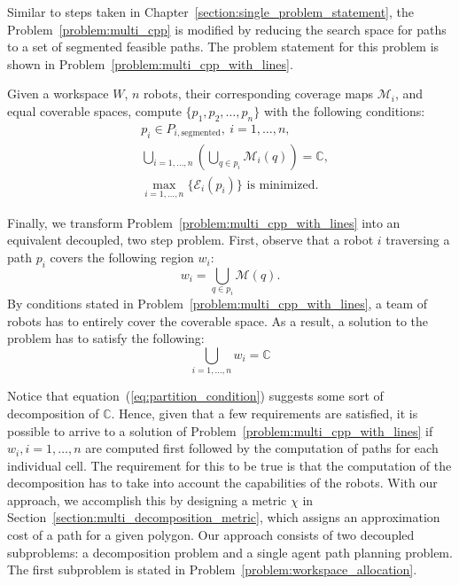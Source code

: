 \documentclass[../main.tex]{subfiles}
\begin{document}
Similar to steps taken in Chapter~\ref{section:single_problem_statement}, the Problem~\ref{problem:multi_cpp} is modified by reducing the search space for paths to a set of segmented feasible paths. The problem statement for this problem is shown in Problem~\ref{problem:multi_cpp_with_lines}.
\begin{problem}
\label{problem:multi_cpp_with_lines}
	Given a workspace $W$, $n$ robots, their corresponding coverage maps $\mathcal{M}_i$, and equal coverable spaces, compute $\{p_1,p_2,\ldots,p_n\}$ with the following conditions:
	\begin{equation}
	\begin{aligned}
		& p_i\in P_{i,\text{segmented}},\ i=1,\dots,n,\\
		& \bigcup_{i=1,\dots,n}(\bigcup_{q\in p_i}\mathcal{M}_i(q))=\mathbb{C},\\
		& \max_{i=1,\ldots,n}\{\mathcal{E}_i(p_i)\}\text{ is minimized.}
	\end{aligned}
	\end{equation}
\end{problem}

Finally, we transform Problem~\ref{problem:multi_cpp_with_lines} into an equivalent decoupled, two step problem. First, observe that a robot $i$ traversing a path $p_i$ covers the following region $w_i$:
\begin{equation}
	w_i=\bigcup_{q\in p_i}\mathcal{M}(q).
\end{equation}
By conditions stated in Problem~\ref{problem:multi_cpp_with_lines}, a team of robots has to entirely cover the coverable space. As a result, a solution to the problem has to satisfy the following:
\begin{equation}
	\label{eq:partition_condition}
	\bigcup_{i=1,\ldots,n}w_i=\mathbb{C}
\end{equation}

Notice that equation~(\ref{eq:partition_condition}) suggests some sort of decomposition of $\mathbb{C}$. Hence, given that a few requirements are satisfied, it is possible to arrive to a solution of Problem~\ref{problem:multi_cpp_with_lines} if $w_i,i=1,\ldots,n$ are computed first followed by the computation of paths for each individual cell. The requirement for this to be true is that the computation of the decomposition has to take into account the capabilities of the robots. With our approach, we accomplish this by designing a metric $\chi$ in Section~\ref{section:multi_decomposition_metric}, which assigns an approximation cost of a path for a given polygon. Our approach consists of two decoupled subproblems: a decomposition problem and a single agent path planning problem. The first subproblem is stated in Problem~\ref{problem:workspace_allocation}.
\end{document}
